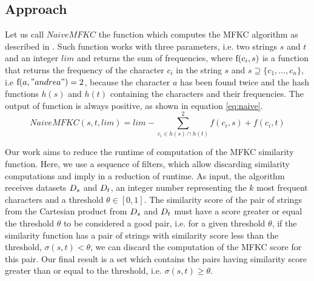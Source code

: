 \subsection{Approach} \label{mfkc}

Let us call $NaiveMFKC$ the function which computes the MFKC algorithm as described in \cite{seker2014novel}.
Such function works with three parameters, i.e. two strings $s$ and $t$ and an integer $lim$ and returns the sum of frequencies, where $\textnormal{f}(c_i, s)$ is a function that returns the frequency of the character $c_i$ in the string $s$ and $s \supseteq \{c_1,...,c_n\}$, i.e $\textnormal{f}(a,"andrea")=2$, because the character $a$ has been found twice and the hash functions $h(s)$ and $h(t)$ containing the characters and their frequencies. The output of function is always positive, as shown in equation \ref{eq:naive}. 
\begin{equation} \label{eq:naive}
	NaiveMFKC(s, t, lim) = lim - \sum_{c_i \in h(s) \cap h(t)}^2 f(c_i,s) + f(c_i,t)
\end{equation}

Our work aims to reduce the runtime of computation of the MFKC similarity function.
Here, we use a sequence of filters, which allow discarding similarity computations and imply in a reduction of runtime.
As input, the algorithm receives datasets ${D_s}{}$ and ${D_t}{}$, an integer number representing the $k$ most frequent characters and a threshold $\theta \in [0,1]$.
The similarity score of the pair of strings from the Cartesian product from ${D_s}{}$ and ${D_t}{}$ must have a score greater or equal the threshold $\theta$ to be considered a good pair, i.e. 
for a given threshold $\theta$, if the similarity function has a pair of strings with similarity score less than the threshold, $\sigma (s, t) < \theta$, we can discard the computation of the MFKC score for this pair. Our final result is a set which contains the pairs having similarity score greater than or equal to the threshold, i.e. $\sigma(s,t) \geq \theta$.



